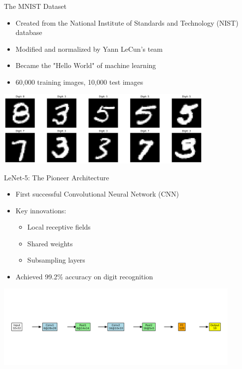 \documentclass{beamer}
\begin{document}
\begin{frame}{The MNIST Dataset}
  \begin{itemize}
    \item Created from the National Institute of Standards and Technology (NIST) database
    \item Modified and normalized by Yann LeCun's team
    \item Became the "Hello World" of machine learning
    \item 60,000 training images, 10,000 test images
  \end{itemize}
  \begin{center}
    \includegraphics[width=0.8\textwidth]{images/mnist_samples.png}
  \end{center}
\end{frame}

\begin{frame}{LeNet-5: The Pioneer Architecture}
  \begin{itemize}
    \item First successful Convolutional Neural Network (CNN)
    \item Key innovations:
      \begin{itemize}
        \item Local receptive fields
        \item Shared weights
        \item Subsampling layers
      \end{itemize}
    \item Achieved 99.2\% accuracy on digit recognition
  \end{itemize}
  \begin{center}
    \includegraphics[width=0.9\textwidth]{images/lenet.png}
  \end{center}
\end{frame}
\end{document}
